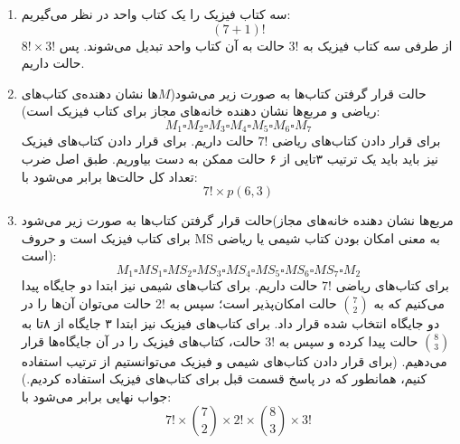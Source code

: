 \begin{enumerate}
  \item 
        سه کتاب فیزیک را یک کتاب واحد در نظر می‌گیریم:
        $$(7+1)!$$
        از طرفی سه کتاب فیزیک به 
        $3!$ حالت به آن کتاب واحد تبدیل می‌شوند. پس 
        $8!\times3!$ حالت داریم.

  \item
        حالت قرار گرفتن کتاب‌ها به صورت زیر می‌شود($M$‌ها نشان دهنده‌ی کتاب‌های ریاضی و مربع‌ها نشان دهنده خانه‌های مجاز برای کتاب فیزیک است):
        $$M_{1}\square M_{2}\square M_{3}\square M_{4}\square M_{5}\square M_{6}\square M_{7}$$
        برای قرار دادن کتاب‌های ریاضی
        $7!$ 
        حالت داریم. برای قرار دادن کتاب‌های فیزیک نیز باید باید یک ترتیب ۳‌تایی از ۶ حالت ممکن به دست بیاوریم. طبق اصل ضرب تعداد کل حالت‌ها برابر می‌‌شود با:
            $$7! \times p(6,3)$$

  \item 
        حالت قرار گرفتن کتاب‌ها به صورت زیر می‌شود(مربع‌ها نشان دهنده خانه‌های مجاز برای کتاب فیزیک است و حروف MS به معنی امکان بودن کتاب شیمی یا ریاضی است):
        $$M_{1}\square MS_{1}\square MS_{2}\square MS_{3}\square MS_{4}\square MS_{5}\square MS_{6}\square MS_{7}\square M_{2}$$
        برای کتاب‌‌های ریاضی
        $7!$
        حالت داریم. برای کتاب‌های شیمی نیز ابتدا دو جایگاه پیدا می‌کنیم که به 
        ${7\choose 2}$
        حالت امکان‌پذیر است؛ سپس به
        $2!$
        حالت می‌توان آن‌ها را در دو جایگاه انتخاب شده قرار داد. برای کتاب‌های فیزیک نیز ابتدا ۳ جایگاه از ۸تا به 
        ${8\choose 3}$
        حالت پیدا کرده و سپس به 
        $3!$
        حالت، کتاب‌های فیزیک را در آن جایگاه‌ها قرار می‌دهیم. (برای قرار دادن کتاب‌های شیمی و فیزیک می‌توانستیم از ترتیب استفاده کنیم، همانطور که در پاسخ قسمت قبل برای کتاب‌های فیزیک استفاده کردیم.) جواب نهایی برابر می‌شود با:
        $$7! \times {7\choose 2}\times 2!\times {8\choose 3}\times 3!$$
\end{enumerate}